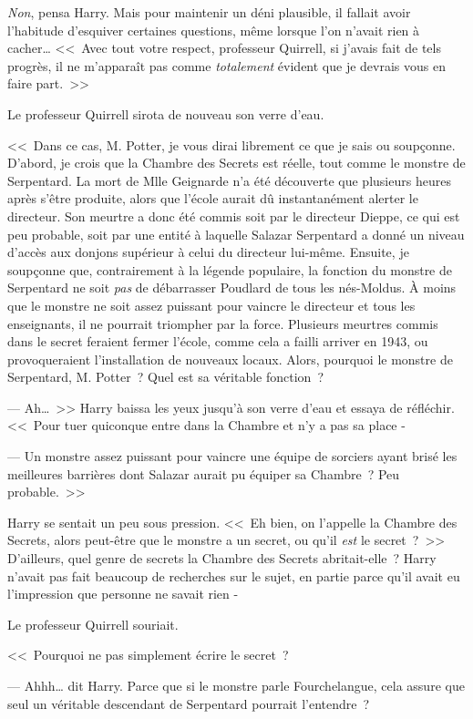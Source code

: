 \emph{Non}, pensa Harry. Mais pour maintenir un déni plausible, il fallait avoir l'habitude d'esquiver certaines questions, même lorsque l'on n'avait rien à cacher… <<~Avec tout votre respect, professeur Quirrell, si j'avais fait de tels progrès, il ne m'apparaît pas comme \emph{totalement} évident que je devrais vous en faire part.~>>

Le professeur Quirrell sirota de nouveau son verre d'eau.

<<~Dans ce cas, M. Potter, je vous dirai librement ce que je sais ou soupçonne. D'abord, je crois que la Chambre des Secrets est réelle, tout comme le monstre de Serpentard. La mort de Mlle Geignarde n'a été découverte que plusieurs heures après s'être produite, alors que l'école aurait dû instantanément alerter le directeur. Son meurtre a donc été commis soit par le directeur Dieppe, ce qui est peu probable, soit par une entité à laquelle Salazar Serpentard a donné un niveau d'accès aux donjons supérieur à celui du directeur lui-même. Ensuite, je soupçonne que, contrairement à la légende populaire, la fonction du monstre de Serpentard ne soit \emph{pas} de débarrasser Poudlard de tous les nés-Moldus. À moins que le monstre ne soit assez puissant pour vaincre le directeur et tous les enseignants, il ne pourrait triompher par la force. Plusieurs meurtres commis dans le secret feraient fermer l'école, comme cela a failli arriver en 1943, ou provoqueraient l'installation de nouveaux locaux. Alors, pourquoi le monstre de Serpentard, M. Potter~? Quel est sa véritable fonction~?

--- Ah…~>> Harry baissa les yeux jusqu'à son verre d'eau et essaya de réfléchir. <<~Pour tuer quiconque entre dans la Chambre et n'y a pas sa place -

--- Un monstre assez puissant pour vaincre une équipe de sorciers ayant brisé les meilleures barrières dont Salazar aurait pu équiper sa Chambre~? Peu probable.~>>

Harry se sentait un peu sous pression. <<~Eh bien, on l'appelle la Chambre des Secrets, alors peut-être que le monstre a un secret, ou qu'il \emph{est} le secret~?~>> D'ailleurs, quel genre de secrets la Chambre des Secrets abritait-elle~? Harry n'avait pas fait beaucoup de recherches sur le sujet, en partie parce qu'il avait eu l'impression que personne ne savait rien -

Le professeur Quirrell souriait.

<<~Pourquoi ne pas simplement écrire le secret~?

--- Ahhh… dit Harry. Parce que si le monstre parle Fourchelangue, cela assure que seul un véritable descendant de Serpentard pourrait l'entendre~?

